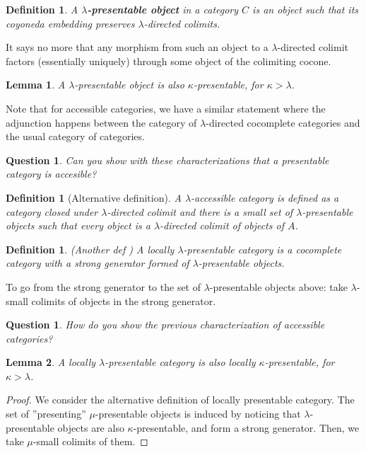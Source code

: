 \documentclass{article}
\newtheorem{definition}[theorem]{Definition}
\newtheorem{question}[theorem]{Question}
\newtheorem{lemma}{Lemma}
\begin{document}
  \begin{definition}
    A \textbf{$\lambda$-presentable object} in a category $C$ is an object such
    that its coyoneda embedding preserves $\lambda$-directed colimits.
  \end{definition}
  It says no more that any morphism from such an object to a $\lambda$-directed
  colimit factors (essentially uniquely) through some object of the colimiting cocone.
  \begin{lemma}
   A $\lambda$-presentable object is also $\kappa$-presentable, for $\kappa > \lambda$.
  \end{lemma}
  Note that for accessible categories, we have a similar statement
  \cite[2.26]{adamek_rosicky} where the adjunction happens between the category
  of $\lambda$-directed cocomplete categories and the usual category of categories.
  \begin{question}
   Can you show with these characterizations that a presentable category is
   accesible? 
  \end{question}
  \begin{definition}[Alternative definition]
  A $\lambda$-accessible category is defined as a category closed
  under $\lambda$-directed colimit and there is a small set of
  $\lambda$-presentable objects such that every object is a $\lambda$-directed
  colimit of objects of $A$.
  \end{definition}
  \begin{definition}
	  (Another def \cite[1.20]{adamek_rosicky})
    A locally $\lambda$-presentable category is a cocomplete category
    with a strong generator formed of $\lambda$-presentable objects.
  \end{definition}
  To go from the strong generator to the set of $\lambda$-presentable objects
  above: take $\lambda$-small colimits of objects in the strong generator.
  \begin{question}
    How do you show the previous characterization of accessible categories?
\end{question}
\begin{lemma}
   A locally $\lambda$-presentable category is also locally $\kappa$-presentable, for $\kappa > \lambda$.
\end{lemma}
\begin{proof}
  We consider the alternative definition of locally presentable category.
  The set of ''presenting'' $\mu$-presentable objects is induced by noticing that
  $\lambda$-presentable objects are also $\kappa$-presentable, and form a strong
  generator. Then, we take $\mu$-small colimits of them.
\end{proof}
\end{document}
